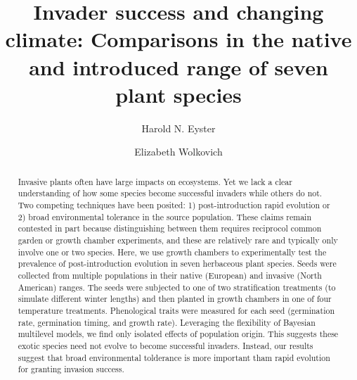 \documentclass[12pt]{article}\usepackage[]{graphicx}\usepackage[]{color}
\title{Invader success and changing climate: Comparisons in the native and introduced range of seven plant species}
\author[1]{Harold N. Eyster}
\author[2]{Elizabeth Wolkovich}
\affil[1]{Institute for Resources, Environment, and Sustainability, University of British Columbia}
\affil[2]{Department of Forest and Conservation Science, University of British Columbia}
\date{}                     %
\begin{document}
\maketitle

\begin{spacing}{1} %
	\begin{abstract}
		Invasive plants often have large impacts on ecosystems.  Yet we lack a clear understanding of how some species become successful invaders while others do not. Two competing techniques have been posited: 1) post-introduction rapid evolution or 2) broad environmental tolerance in the source population. These claims remain contested in part because distinguishing between them requires reciprocol common garden or growth chamber experiments, and these are relatively rare and typically only involve one or two species. Here, we use growth chambers to experimentally test the prevalence of post-introduction evolution in seven herbaceous plant species. Seeds were collected from multiple populations in their native (European) and invasive (North American) ranges. The seeds were subjected to one of two stratification treatments (to simulate different winter lengths) and then planted in growth chambers in one of four temperature treatments. Phenological traits were measured for each seed (germination rate, germination timing, and growth rate). Leveraging the flexibility of Bayesian multilevel models, we find only isolated effects of population origin. This suggests these exotic species need not evolve to become successful invaders. Instead, our results suggest that broad environmental tolderance is more important tham rapid evolution for granting invasion success. 
	\end{abstract}
\end{spacing}		
\end{document}
